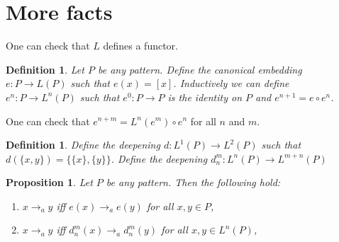 \documentclass[a4paper]{article}
\newtheorem{proposition}[theorem]{Proposition}
\newtheorem{definition}[theorem]{Definition}
\begin{document}
\section{More facts}

One can check that $L$ defines a functor.

\begin{definition}
 Let $P$ be any pattern. Define the \emph{canonical embedding} $e : P
\to L(P)$ such that $e(x) = [x]$. Inductively we can define $e^n : P \to
L^n(P)$ such that $e^0 : P \to P$ is the identity on $P$ and $e^{n + 1}
= e \circ e^n$.
\end{definition}

One can check that $e^{n + m} = L^n(e^m) \circ e^n$ for all $n$ and $m$.


\begin{definition}
 Define the \emph{deepening} $d : L^1(P) \to L^2(P)$ such that
$d(\{x,y\}) = \{\{x\},\{y\}\}$.
Define the \emph{deepening} $d^m_n : L^n(P) \to L^{m +
n}(P)$
\end{definition}

\begin{proposition}
Let $P$ be any pattern. Then the following hold:
\begin{enumerate}
 \item $x \rightarrow_a y$ iff $e(x) \rightarrow_a e(y)$ for all $x,y
\in P$,
 \item $x \rightarrow_a y$ iff $d^m_n(x) \rightarrow_a d^m_n(y)$ for all
$x,y \in L^n(P)$,
\end{enumerate}


\end{proposition}
\end{document}
